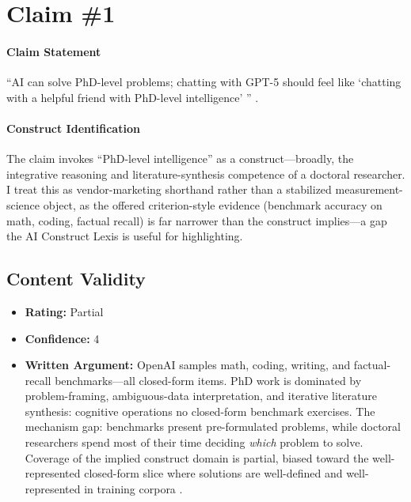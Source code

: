 \section{Claim \#1}

\paragraph{Claim Statement} ``AI can solve PhD-level problems; chatting with GPT-5 should feel like `chatting with a helpful friend with PhD-level intelligence' '' \citep{openai2025gpt5}.

\paragraph{Construct Identification} The claim invokes ``PhD-level intelligence'' as a construct---broadly, the integrative reasoning and literature-synthesis competence of a doctoral researcher. I treat this as vendor-marketing shorthand rather than a stabilized measurement-science object, as the offered criterion-style evidence (benchmark accuracy on math, coding, factual recall) is far narrower than the construct implies---a gap the AI Construct Lexis \citep{aiconstructlexis} is useful for highlighting.

\subsection{Content Validity}
\begin{itemize}
    \item \textbf{Rating:} Partial
    \item \textbf{Confidence:} 4
    \item \textbf{Written Argument:} OpenAI samples math, coding, writing, and factual-recall benchmarks---all closed-form items. PhD work is dominated by problem-framing, ambiguous-data interpretation, and iterative literature synthesis: cognitive operations no closed-form benchmark exercises. The mechanism gap: benchmarks present pre-formulated problems, while doctoral researchers spend most of their time deciding \emph{which} problem to solve. Coverage of the implied construct domain is partial, biased toward the well-represented closed-form slice where solutions are well-defined and well-represented in training corpora \citep{salaudeen2025measurement}.
\end{itemize}

